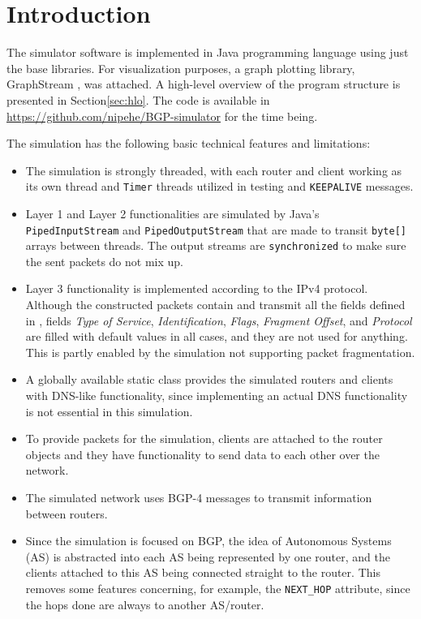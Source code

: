 \documentclass[11pt,a4paper,titlepage]{report}
\begin{document}
\section{Introduction}\label{sec:intro}
The simulator software is implemented in Java programming language using just the base libraries. For visualization purposes, a graph plotting library, GraphStream \cite{graphstreamteam2017}, was attached. A high-level overview of the program structure is presented in Section\ref{sec:hlo}. The code is available in \url{https://github.com/nipehe/BGP-simulator} for the time being.

The simulation has the following basic technical features and limitations:
\begin{itemize}
\item The simulation is strongly threaded, with each router and client working as its own thread and \texttt{Timer} threads utilized in testing and \texttt{KEEPALIVE} messages.
\item Layer 1 and Layer 2 functionalities are simulated by Java's \texttt{PipedInputStream} and \texttt{PipedOutputStream} that are made to transit \texttt{byte[]} arrays between threads. The output streams are \texttt{synchronized} to make sure the sent packets do not mix up.
\item Layer 3 functionality is implemented according to the IPv4 protocol. Although the constructed packets contain and transmit all the fields defined in \cite{RFC0791}, fields \emph{Type of Service}, \emph{Identification}, \emph{Flags}, \emph{Fragment Offset}, and \emph{Protocol} are filled with default values in all cases, and they are not used for anything. This is partly enabled by the simulation not supporting packet fragmentation.
\item A globally available static class provides the simulated routers and clients with DNS-like functionality, since implementing an actual DNS functionality is not essential in this simulation.
\item To provide packets for the simulation, clients are attached to the router objects and they have functionality to send data to each other over the network.
\item The simulated network uses BGP-4 messages to transmit information between routers.
\item Since the simulation is focused on BGP, the idea of Autonomous Systems (AS) is abstracted into each AS being represented by one router, and the clients attached to this AS being connected straight to the router. This removes some features concerning, for example, the \texttt{NEXT\_HOP} attribute, since the hops done are always to another AS/router.

\end{itemize}
\end{document}
